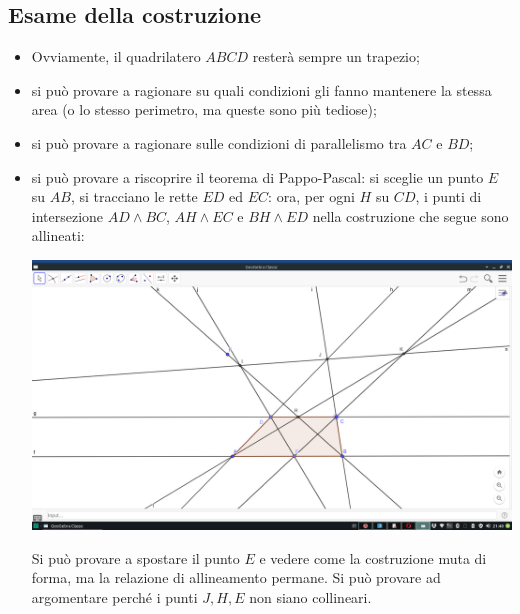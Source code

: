 \documentclass{article}
\begin{document}
\subsection{Esame della costruzione}
\begin{itemize}
  \item Ovviamente, il quadrilatero $ABCD$ resterà sempre un trapezio;
  \item si può provare a ragionare su quali condizioni gli fanno mantenere la stessa area (o lo stesso perimetro, ma queste sono più tediose);
  \item si può provare a ragionare sulle condizioni di parallelismo tra $AC$ e $BD$;
  \item si può provare a riscoprire il teorema di Pappo-Pascal: si sceglie un punto $E$ su $AB$, si tracciano le rette $ED$ ed $EC$: ora, per ogni $H$ su $CD$, i punti di intersezione $AD\land BC$, $AH\land EC$ e $BH\land ED$ nella costruzione che segue sono allineati:
\begin{center}
  \includegraphics[width=.75\textwidth]{pap.png}
\end{center}
Si può provare a spostare il punto $E$ e vedere come la costruzione muta di forma, ma la relazione di allineamento permane. Si può provare ad argomentare perché i punti $J,H,E$ non siano collineari.
\end{itemize}
\end{document}
